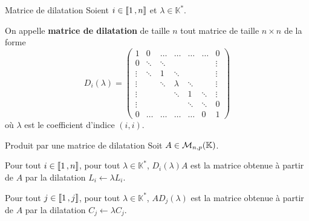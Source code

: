     \begin{defi}{Matrice de dilatation}{}
        Soient $i \in \left\llbracket 1 \, , n \right\rrbracket$ et $\lambda \in \mathbb{K}^*$.

        On appelle \textbf{matrice de dilatation} de taille $n$ tout matrice de taille $n \times n$ de la forme 
        \[ D_i(\lambda) = \begin{pmatrix}
            1 & 0 & \ldots & \ldots & \ldots & \ldots & 0 \\
            0 & \ddots & \ddots & & & & \vdots \\
            \vdots & \ddots & 1 & \ddots & & & \vdots \\
            \vdots & & \ddots & \lambda & \ddots & & \vdots \\
            \vdots & & & \ddots & 1 & \ddots & \vdots \\
            \vdots & & & & \ddots & \ddots & 0 \\
            0 & \ldots & \ldots & \ldots & \ldots & 0 & 1
        \end{pmatrix} \] où $\lambda$ est le coefficient d’indice $(i,i)$.
    \end{defi}

    \begin{prop}{Produit par une matrice de dilatation}{}
        Soit $A \in \mathcal{M}_{n,p}(\mathbb{K})$.

        \begin{alors}
            \item Pour tout $i \in \left\llbracket 1 \, , n \right\rrbracket$, pour tout $\lambda \in \mathbb{K}^*$, $D_i(\lambda)A$ est la matrice obtenue à partir de $A$ par la dilatation $L_i \leftarrow \lambda L_i$.
            \item Pour tout $j \in \left\llbracket 1 \, , j \right\rrbracket$, pour tout $\lambda \in \mathbb{K}^*$, $AD_j(\lambda)$ est la matrice obtenue à partir de $A$ par la dilatation $C_j \leftarrow \lambda C_j$.
        \end{alors}
    \end{prop}

